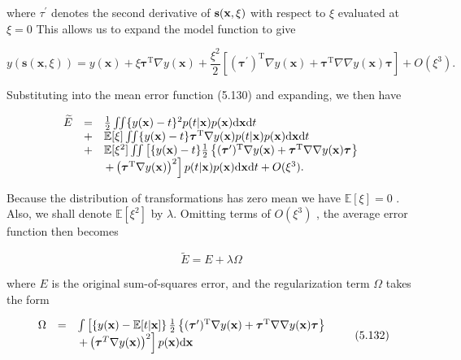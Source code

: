 \documentclass[
  10
]{article}
\begin{document}
where \(\tau ^ { \prime }\) denotes the second derivative of
\({ \bf s } ( { \bf x } , \xi )\) with respect to \(\xi\) evaluated at
\(\xi = 0\) This allows us to expand the model function to give

\[
y (\mathbf {s} (\mathbf {x}, \xi)) = y (\mathbf {x}) + \xi \pmb {\tau} ^ {\mathrm{T}} \nabla y (\mathbf {x}) + \frac {\xi^ {2}}{2} \left[ (\pmb {\tau} ^ {\prime}) ^ {\mathrm{T}} \nabla y (\mathbf {x}) + \pmb {\tau} ^ {\mathrm{T}} \nabla \nabla y (\mathbf {x}) \pmb {\tau} \right] + O (\xi^ {3}).
\]

Substituting into the mean error function (5.130) and expanding, we then
have

\[
\begin{array}{r c l} \widetilde {E} & = & \frac {1}{2} \iint \{y (\mathbf {x}) - t \} ^ {2} p (t | \mathbf {x}) p (\mathbf {x})   \mathrm{d} \mathbf {x}   \mathrm{d} t \\ & + & \mathbb {E} [ \xi ] \iint \{y (\mathbf {x}) - t \} \boldsymbol {\tau} ^ {\mathrm{T}} \nabla y (\mathbf {x}) p (t | \mathbf {x}) p (\mathbf {x})   \mathrm{d} \mathbf {x}   \mathrm{d} t \\ & + & \mathbb {E} [ \xi^ {2} ] \iint \left[ \{y (\mathbf {x}) - t \} \frac {1}{2} \left\{(\boldsymbol {\tau} ^ {\prime}) ^ {\mathrm{T}} \nabla y (\mathbf {x}) + \boldsymbol {\tau} ^ {\mathrm{T}} \nabla \nabla y (\mathbf {x}) \boldsymbol {\tau} \right\} \right. \\ & & \left. + \left(\boldsymbol {\tau} ^ {\mathrm{T}} \nabla y (\mathbf {x})\right) ^ {2} \right] p (t | \mathbf {x}) p (\mathbf {x})   \mathrm{d} \mathbf {x}   \mathrm{d} t + O (\xi^ {3}). \end{array}
\]

Because the distribution of transformations has zero mean we have
\(\mathbb { E } [ \xi ] = 0\) . Also, we shall denote
\(\mathbb { E } [ \xi ^ { 2 } ]\) by \(\lambda .\) Omitting terms of
\(O ( \xi ^ { 3 } )\) , the average error function then becomes

\[
\widetilde {E} = E + \lambda \Omega\tag{5.131}
\]

where \(E\) is the original sum-of-squares error, and the regularization
term \(\Omega\) takes the form

\[
\begin{array}{r c l} \Omega & = & \int \left[ \left\{y (\mathbf {x}) - \mathbb {E} [ t | \mathbf {x} ] \right\} \frac {1}{2} \left\{(\boldsymbol {\tau} ^ {\prime}) ^ {\mathrm{T}} \nabla y (\mathbf {x}) + \boldsymbol {\tau} ^ {\mathrm{T}} \nabla \nabla y (\mathbf {x}) \boldsymbol {\tau} \right\} \right. \\ & & \left. + \left(\boldsymbol {\tau} ^ {T} \nabla y (\mathbf {x})\right) ^ {2} \right] p (\mathbf {x})   \mathrm{d} \mathbf {x} \end{array}\tag{5.132}
\]
\end{document}
